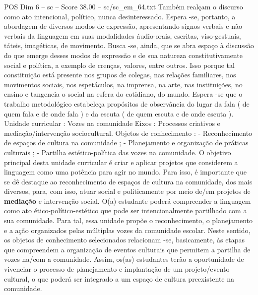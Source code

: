 \begin{textsample}{POS Dim 6 – sc – Score 38.00 – sc/sc\_em\_64.txt}
Também realçam o discurso como ato intencional, político, nunca desinteressado.
Espera -se, portanto, a abordagem de diversos modos de expressão, apresentando signos verbais e não verbais da linguagem em suas modalidades áudio-orais, escritas, viso-gestuais, táteis, imagéticas, de movimento.
Busca -se, ainda, que se abra espaço à discussão do que emerge desses modos de expressão e de sua natureza constitutivamente social e política, a exemplo de crenças, valores, entre outros.
Isso porque tal constituição está presente nos grupos de colegas, nas relações familiares, nos movimentos sociais, nos espetáculos, na imprensa, na arte, nas instituições, no ensino e tangencia o social na esfera do cotidiano, do mundo.
Espera -se que o trabalho metodológico estabeleça propósitos de observância do lugar da fala ( de quem fala e de onde fala ) e da escuta ( de quem escuta e de onde escuta ).
Unidade curricular : Vozes na comunidade Eixos : Processos criativos e mediação/intervenção sociocultural.
Objetos de conhecimento : - Reconhecimento de espaços de cultura na comunidade ; - Planejamento e organização de práticas culturais ; - Partilha estético-política das vozes na comunidade.
O objetivo principal desta unidade curricular é criar e aplicar projetos que considerem a linguagem como uma potência para agir no mundo.
Para isso, é importante que se dê destaque ao reconhecimento de espaços de cultura na comunidade, dos mais diversos, para, com isso, atuar social e politicamente por meio de/em projetos de \textbf{mediação} e intervenção social.
O(a) estudante poderá compreender a linguagem como ato ético-político-estético que pode ser intencionalmente partilhado com a sua comunidade.
Para tal, essa unidade propõe o reconhecimento, o planejamento e a ação organizados pelas múltiplas vozes da comunidade escolar.
Neste sentido, os objetos de conhecimento selecionados relacionam -se, basicamente, às etapas que compreendem a organização de eventos culturais que permitem a partilha de vozes na/com a comunidade.
Assim, os(as) estudantes terão a oportunidade de vivenciar o processo de planejamento e implantação de um projeto/evento cultural, o que poderá ser integrado a um espaço de cultura preexistente na comunidade.

\end{textsample}
